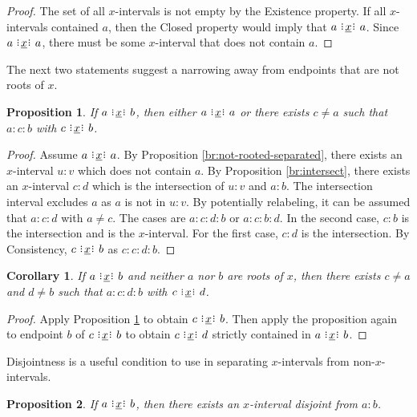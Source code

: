 \documentclass[12pt]{article}
\newtheorem{corollary}{Corollary}[section]
\newtheorem{proposition}{Proposition}[section]
\begin{document}
\begin{proof}
    The set of all $x$-intervals is not empty by the Existence property. If all $x$-intervals contained $a$, then the Closed property would imply that $a \xrel a$. Since  \sout{$a \xrel a$}, there must be some $x$-interval that does not contain $a$. 
\end{proof}

The next two statements suggest a narrowing away from endpoints that are not roots of $x$. 

\begin{proposition}\label{br:something-inside}
    If $a \xrel b$, then either $a \xrel a$ or there exists $c \neq a$ such that $a : c : b$ with $c \xrel b$. 
\end{proposition}

\begin{proof}
    Assume \sout{$a \xrel a$}. By Proposition \ref{br:not-rooted-separated}, there exists an $x$-interval $u:v$ which does not contain $a$. By Proposition \ref{br:intersect}, there exists an $x$-interval  $c:d$ which is the intersection of $u:v$ and $a:b$. The intersection interval excludes $a$ as $a$ is not in $u:v$. By potentially relabeling, it can be assumed that $a:c:d$ with $a \neq c$. The cases are $a:c:d:b$ or $a:c:b:d$. In the second case, $c:b$ is the intersection and is the $x$-interval. For the first case, $c:d$ is the intersection. By Consistency, $c \xrel b$ as $c:c:d:b$. 
\end{proof}

\begin{corollary}\label{br:doublesomething-inside}
    If $a \xrel b$ and neither $a$ nor $b$ are roots of $x$, then there exists $c \neq a$ and $d \neq b$ such that $a : c : d : b$ with $c \xrel d$. 
\end{corollary}

\begin{proof}
Apply Proposition \ref{br:something-inside} to obtain $c \xrel b$. Then apply the proposition again to endpoint $b$ of $c \xrel b$ to obtain $c \xrel d$ strictly contained in $a \xrel b$. 
\end{proof}

Disjointness is a useful condition to use in separating $x$-intervals from non-$x$-intervals. 

\begin{proposition}\label{br:something-outside}
    If \sout{$a \xrel b$}, then there exists an $x$-interval disjoint from $a:b$.
\end{proposition}
\end{document}

